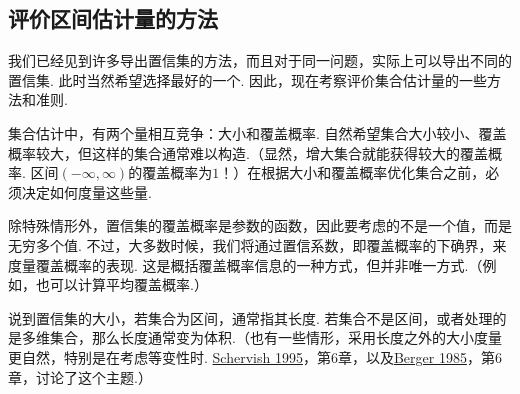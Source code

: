 \subsection{评价区间估计量的方法}\label{sec:9.3}
我们已经见到许多导出置信集的方法，而且对于同一问题，实际上可以导出不同的置信集. 此时当然希望选择最好的一个. 因此，现在考察评价集合估计量的一些方法和准则.

集合估计中，有两个量相互竞争：大小和覆盖概率. 自然希望集合大小较小、覆盖概率较大，但这样的集合通常难以构造.（显然，增大集合就能获得较大的覆盖概率. 区间$(-\infty,\infty)$的覆盖概率为$1$！）在根据大小和覆盖概率优化集合之前，必须决定如何度量这些量.

除特殊情形外，置信集的覆盖概率是参数的函数，因此要考虑的不是一个值，而是无穷多个值. 不过，大多数时候，我们将通过置信系数，即覆盖概率的下确界，来度量覆盖概率的表现. 这是概括覆盖概率信息的一种方式，但并非唯一方式.（例如，也可以计算平均覆盖概率.）

说到置信集的大小，若集合为区间，通常指其长度. 若集合不是区间，或者处理的是多维集合，那么长度通常变为体积.（也有一些情形，采用长度之外的大小度量更自然，特别是在考虑等变性时. \hyperref[bib:source276]{Schervish 1995}，第6章，以及\hyperref[bib:source18]{Berger 1985}，第6章，讨论了这个主题.）
